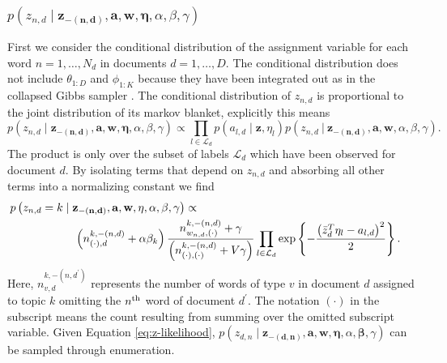 \documentclass{article}
\begin{document}
\subsubsection{$p\left(z_{n,d} \mid\mathbf{z_{-\left(n,d\right)}},\mathbf{a},\mathbf{w},\mathbf{\eta},\alpha,\beta,\gamma\right)$}
%
First we consider the conditional distribution of the assignment variable for each word $n = 1, \ldots, N_d$ in documents $d = 1, \ldots, D$.  The conditional distribution does not include $\theta_{1:D}$ and $\phi_{1:K}$ because they have been integrated out as in the collapsed Gibbs sampler \citep{Griffiths04}.  The conditional distribution of $z_{n,d}$ is proportional to the joint distribution of its markov blanket, explicitly this means
%
%
%
\begin{equation}
p\left(z_{n,d}\mid\mathbf{z_{-\left(n,d\right)}},\mathbf{a},\mathbf{w},\mathbf{\eta},\alpha,\beta,\gamma\right)\propto \prod_{l \in \mathcal{L}_d}p\left(a_{l,d}\mid\mathbf{z},\eta_l \right)p\left(z_{n,d} \ | \ \mathbf{z_{-\left(n, d \right)}},\mathbf{a},\mathbf{w},\alpha,\beta,\gamma\right).
\end{equation}
%
The product is only over the subset of labels $\mathcal{L}_d$ which have been observed for document $d$. By isolating terms that depend on $z_{n,d}$ and absorbing all other terms into a normalizing constant \citep{Griffiths04} we find 
%
\begin{eqnarray}
\lefteqn{p\left(z_{n,d} = k \mid\mathbf{z_{-\left(n,d\right)}},\mathbf{a},\mathbf{w}, \mathbf{\eta},\alpha,\beta,\gamma\right)\propto} \nonumber\\ 
& \hspace{2cm}  \left(n_{\left(\cdot\right),d}^{k,-\left(n,d\right)}+\alpha\beta_{k}\right)\frac{n_{w_{n,d},\left(\cdot\right)}^{k,-\left(n,d\right)}+\gamma}{\left(n_{\left(\cdot\right),\left(\cdot\right)}^{k,-\left(n,d\right)}+V\gamma\right)} \prod_{l \in \mathcal{L}_d} \exp\left\{ -\frac{\left(\bar z_d^{T}\eta_{l}-a_{l,d} \right)^{2}}{2}\right\}\label{eq:z-likelihood}.
\end{eqnarray}
%
Here, $n_{v,d}^{k,-\left(n, d^{\prime} \right)}$ represents the number of words of type $v$ in document $d$ assigned to topic $k$ omitting the $n^{\rm th}$ word of document $d^{\prime}$.  The notation $(\cdot)$ in the subscript means the count resulting from summing over the omitted subscript variable.  Given Equation \ref{eq:z-likelihood}, $p\left(z_{d,n}\mid\mathbf{z_{-\left(d,n\right)}},\mathbf{a},\mathbf{w},\mathbf{\eta},\alpha,\mathbf{\beta},\gamma\right)$ can be sampled through enumeration.
%
\end{document}
